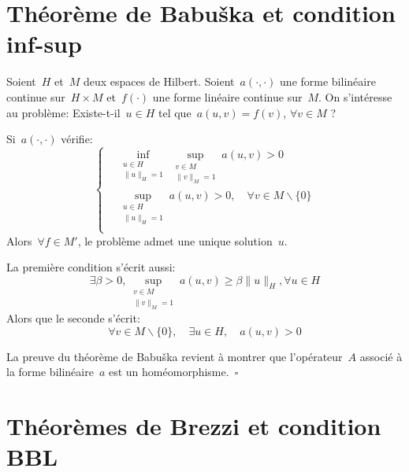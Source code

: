 \medskip
\section{Théorème de Babuška et condition inf-sup}\label{Sec-ThBabuska}

\begin{theoreme}
Soient~$H$ et~$M$ deux espaces de Hilbert.
Soient~$a(\cdot,\cdot)$ une forme bilinéaire continue sur~$H \times M$ et~$f(\cdot)$ une forme linéaire continue sur~$M$.
On s'intéresse au problème: Existe-t-il~$u\in H$ tel que~$a(u,v)=f(v)$, $\forall v\in M$ ?

Si~$a(\cdot,\cdot)$ vérifie:
\begin{equation}\left\{
\begin{aligned}
&\displaystyle\inf_{\substack{u\in H\\\|u\|_H=1}} \sup_{\substack{v\in M\\\|v\|_M=1}} a(u,v) > 0\\[+2mm]
&\displaystyle\sup_{\substack{u\in H\\\|u\|_H=1}} a(u,v) > 0, \quad\forall v\in M\backslash\{0\}\\
\end{aligned}\right.
\end{equation}
Alors~$\forall f\in M'$, le problème admet une unique solution~$u$.
\end{theoreme}

\medskip
La première condition s'écrit aussi:
\begin{equation}
\exists \beta > 0, \sup_{\substack{v\in M\\\|v\|_M=1}} a(u,v) \ge \beta \|u\|_H, \forall u\in H
\end{equation}
Alors que le seconde s'écrit:
\begin{equation}
\forall v\in M\backslash\{0\},\quad \exists u\in H,\quad a(u,v)>0
\end{equation}

\begin{demonstration}\footnotesize{}
La preuve du théorème de Babuška revient à montrer que l'opérateur~$A$ associé à la forme bilinéaire~$a$ est un homéomorphisme.~$\square$
\end{demonstration}

\medskip%
\section{Théorèmes de Brezzi et condition BBL}\label{Sec-ThBrezzi}

